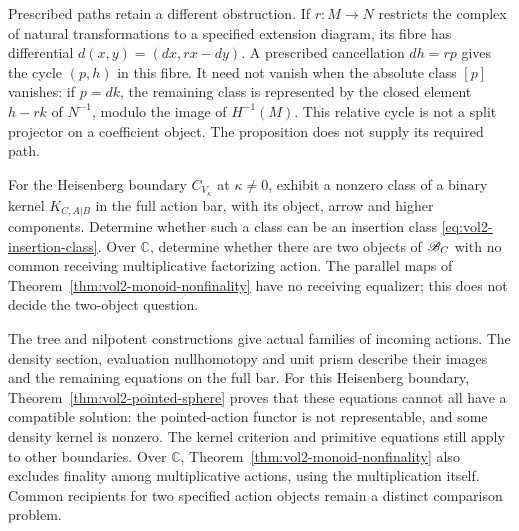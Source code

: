 Prescribed paths retain a different obstruction. If
$r:M\to N$ restricts the complex of natural transformations
to a specified extension diagram, its fibre has differential
$d(x,y)=(dx,rx-dy)$. A prescribed cancellation $dh=rp$ gives
the cycle $(p,h)$ in this fibre. It need not vanish when the
absolute class $[p]$ vanishes: if $p=dk$, the remaining class
is represented by the closed element $h-rk$ of $N^{-1}$,
modulo the image of $H^{-1}(M)$. This relative cycle is not a
split projector on a coefficient object. The proposition does
not supply its required path.

\begin{problem}\label{qn:vol2-geometric-recipient}
For the Heisenberg boundary $C_{V_\kappa}$ at $\kappa\ne0$,
exhibit a nonzero class of a binary kernel $K_{C,A|B}$ in
the full action bar, with its object, arrow and higher components.
Determine whether such a class can be an insertion class
\eqref{eq:vol2-insertion-class}.
Over $\mathbb C$, determine whether there are two objects of
$\mathscr B_C$ with no common receiving multiplicative factorizing
action. The parallel maps of
Theorem~\ref{thm:vol2-monoid-nonfinality} have no receiving
equalizer; this does not decide the two-object question.
\end{problem}

The tree and nilpotent constructions give actual
families of incoming actions. The density section,
evaluation nullhomotopy and unit prism describe their
images and the remaining equations on the full bar.
For this Heisenberg boundary,
Theorem~\ref{thm:vol2-pointed-sphere} proves that these equations
cannot all have a compatible solution: the pointed-action
functor is not representable, and some density kernel is nonzero.
The kernel criterion and primitive equations still apply to
other boundaries. Over $\mathbb C$,
Theorem~\ref{thm:vol2-monoid-nonfinality} also excludes finality
among multiplicative actions, using the multiplication itself.
Common recipients for two specified action objects remain a
distinct comparison problem.

\endgroup
